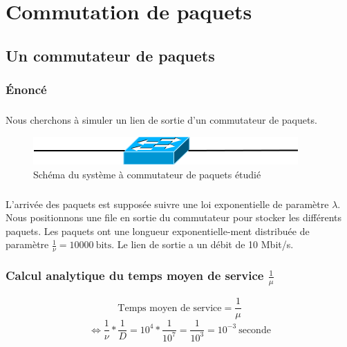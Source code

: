 %
\chapter{Commutation de paquets}
%
    \section{Un commutateur de paquets}
%
        \subsection{Énoncé}
%
            \paragraph{}
Nous cherchons à simuler un lien de sortie d'un commutateur de paquets.
%
            \begin{figure}[h]
                \centering
                \includegraphics[scale=0.5]{RSC/2-0.png}
                \caption{ Schéma du système à commutateur de paquets étudié }
                \label{ Schema du systeme a commutateur de paquets }
            \end{figure}
%
            \paragraph{}
L'arrivée des paquets est supposée suivre une loi exponentielle de paramètre $\lambda$.
Nous positionnons une file en sortie du commutateur pour stocker les différents paquets.
Les paquets ont une longueur exponentielle-ment distribuée de paramètre $\frac{1}{\nu} = 10 000 \ \text{bits}$.
Le lien de sortie a un débit de 10 Mbit/s.
%
        \subsection{Calcul analytique du temps moyen de service $\frac{1}{\mu}$}
\[  \text{Temps moyen de service} = \frac{1}{\mu} \]
\[ \iff \frac{1}{\nu} * \frac{1}{D} = 10^{4} * \frac{1}{10^{7}} = \frac{1}{10^{3}} = 10^{-3} \ \text{seconde} \]
%
